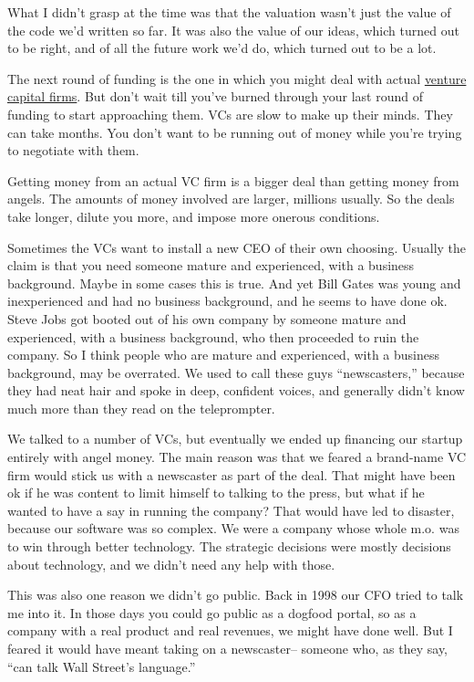 \documentclass[12pt]{book}
\begin{document}
What I didn't grasp at the time was that the valuation wasn't just the
value of the code we'd written so far. It was also the value of our
ideas, which turned out to be right, and of all the future work we'd do,
which turned out to be a lot.

The next round of funding is the one in which you might deal with actual
\href{venturecapital.html}{venture capital firms}. But don't wait till
you've burned through your last round of funding to start approaching
them. VCs are slow to make up their minds. They can take months. You
don't want to be running out of money while you're trying to negotiate
with them.

Getting money from an actual VC firm is a bigger deal than getting money
from angels. The amounts of money involved are larger, millions usually.
So the deals take longer, dilute you more, and impose more onerous
conditions.

Sometimes the VCs want to install a new CEO of their own choosing.
Usually the claim is that you need someone mature and experienced, with
a business background. Maybe in some cases this is true. And yet Bill
Gates was young and inexperienced and had no business background, and he
seems to have done ok. Steve Jobs got booted out of his own company by
someone mature and experienced, with a business background, who then
proceeded to ruin the company. So I think people who are mature and
experienced, with a business background, may be overrated. We used to
call these guys ``newscasters,'' because they had neat hair and spoke in
deep, confident voices, and generally didn't know much more than they
read on the teleprompter.

We talked to a number of VCs, but eventually we ended up financing our
startup entirely with angel money. The main reason was that we feared a
brand-name VC firm would stick us with a newscaster as part of the deal.
That might have been ok if he was content to limit himself to talking to
the press, but what if he wanted to have a say in running the company?
That would have led to disaster, because our software was so complex. We
were a company whose whole m.o. was to win through better technology.
The strategic decisions were mostly decisions about technology, and we
didn't need any help with those.

This was also one reason we didn't go public. Back in 1998 our CFO tried
to talk me into it. In those days you could go public as a dogfood
portal, so as a company with a real product and real revenues, we might
have done well. But I feared it would have meant taking on a
newscaster-- someone who, as they say, ``can talk Wall Street's
language.''
\end{document}
